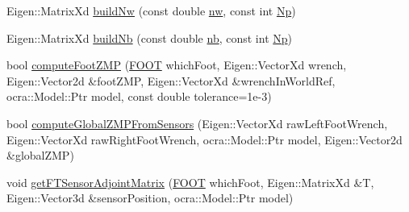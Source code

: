 \begin{DoxyCompactItemize}
\item 
\-Eigen\-::\-Matrix\-Xd \hyperlink{classZmpPreviewController_a6af233960b02ee593f2b781967fc2f5e}{build\-Nw} (const double \hyperlink{classZmpPreviewController_a783427b817d77469e1f80426bede5310}{nw}, const int \hyperlink{classZmpPreviewController_a2de373daf73b4c28f4b6387787bd27e2}{\-Np})
\item 
\-Eigen\-::\-Matrix\-Xd \hyperlink{classZmpPreviewController_a23b30df39849a4f22c5ebf94b87e8425}{build\-Nb} (const double \hyperlink{classZmpPreviewController_a6716ee4c94e6f91e608ee1e29fbc7051}{nb}, const int \hyperlink{classZmpPreviewController_a2de373daf73b4c28f4b6387787bd27e2}{\-Np})
\item 
bool \hyperlink{classZmpPreviewController_a1f5bf084ce93391fbebd63e467d9adbc}{compute\-Foot\-Z\-M\-P} (\hyperlink{utils_8h_a4b6a8e135f90bd56e5a57a60efb42529}{\-F\-O\-O\-T} which\-Foot, \-Eigen\-::\-Vector\-Xd wrench, \-Eigen\-::\-Vector2d \&foot\-Z\-M\-P, \-Eigen\-::\-Vector\-Xd \&wrench\-In\-World\-Ref, ocra\-::\-Model\-::\-Ptr model, const double tolerance=1e-\/3)
\item 
bool \hyperlink{classZmpPreviewController_a46dfe0448f3f14927960a072dc42346d}{compute\-Global\-Z\-M\-P\-From\-Sensors} (\-Eigen\-::\-Vector\-Xd raw\-Left\-Foot\-Wrench, \-Eigen\-::\-Vector\-Xd raw\-Right\-Foot\-Wrench, ocra\-::\-Model\-::\-Ptr model, \-Eigen\-::\-Vector2d \&global\-Z\-M\-P)
\item 
void \hyperlink{classZmpPreviewController_aa4bbd8b205ae1d539620ec7d5f258d4a}{get\-F\-T\-Sensor\-Adjoint\-Matrix} (\hyperlink{utils_8h_a4b6a8e135f90bd56e5a57a60efb42529}{\-F\-O\-O\-T} which\-Foot, \-Eigen\-::\-Matrix\-Xd \&\-T, \-Eigen\-::\-Vector3d \&sensor\-Position, ocra\-::\-Model\-::\-Ptr model)
\end{DoxyCompactItemize}
